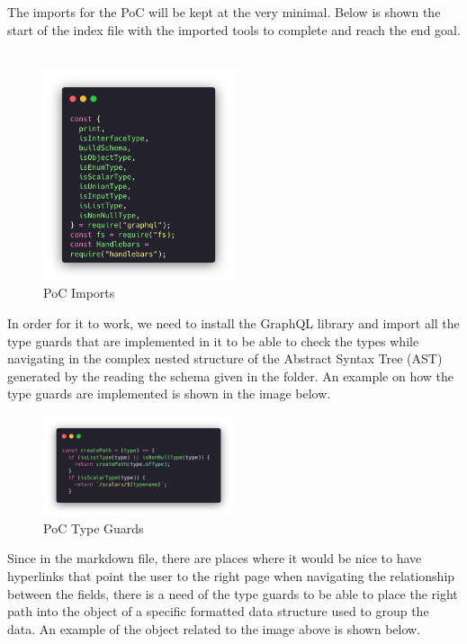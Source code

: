 The imports for the PoC will be kept at the very minimal. Below is shown
the start of the index file with the imported tools to complete and reach the
end goal.
\
\begin{figure}[H]
  \centering
  \includegraphics[width=0.5\textwidth]{figures/code/poc-imports.png}
  \caption{PoC Imports}
  \label{f:ch5-poc-imports}
\end{figure}

In order for it to work, we need to install the GraphQL library and import
all the type guards that are implemented in it to be able to check the types
while navigating in the complex nested structure of the Abstract Syntax Tree (AST)
generated by the reading the schema given in the folder. An example on how the
type guards are implemented is shown in the image below.

\begin{figure}[H]
  \centering
  \includegraphics[width=0.5\textwidth]{figures/code/poc-type-guards.png}
  \caption{PoC Type Guards}
  \label{f:ch5-poc-type-guards}
\end{figure}

Since in the markdown file, there are places where it would be nice to have
hyperlinks that point the user to the right page when navigating the
relationship between the fields, there is a need of the type guards to be able
to place the right path into the object of a specific formatted data structure
used to group the data. An example of the object related to the image above is
shown below.

